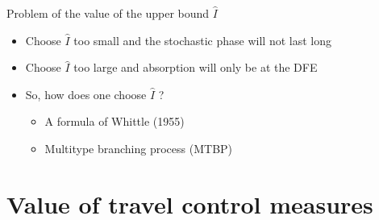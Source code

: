 \documentclass[aspectratio=169]{beamer}\usepackage[]{graphicx}\usepackage[]{xcolor}
\begin{document}
\begin{frame}{Problem of the value of the upper bound $\hat I$}
	\begin{itemize}
		\item Choose $\hat I$ too small and the stochastic phase will not last long
		\vfill
		\item Choose $\hat I$ too large and absorption will only be at the DFE
		\vfill
		\item So, how does one choose $\hat I$ ?
		\begin{itemize}
			\item A formula of Whittle (1955)
			\item Multitype branching process (MTBP)
		\end{itemize}
	\end{itemize}
\end{frame}

\section{Value of travel control measures}
\end{document}
